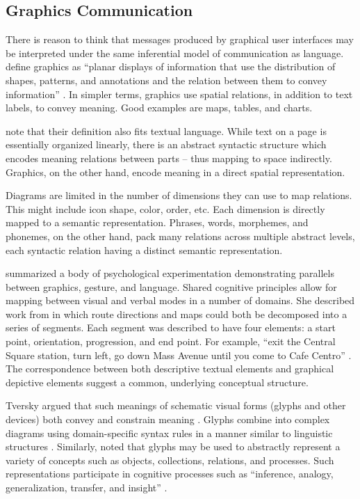 \subsection{Graphics Communication}
\label{graphicscommunication}

There is reason to think that messages produced by graphical user interfaces may be interpreted under the same inferential model of communication as language.  \cite{Stenning:2006wu}  define graphics as ``planar displays of information that use the distribution of shapes, patterns, and annotations and the relation between them to convey information''  \cite[p. 476]{Stenning:2006wu}.  In simpler terms, graphics use spatial relations, in addition to text labels, to convey meaning. Good examples are maps, tables, and charts. 

 \cite{Stenning:2006wu}  note that their definition also fits textual language. While text on a page is essentially organized linearly, there is an abstract syntactic structure which encodes meaning relations between parts -- thus mapping to space indirectly. Graphics, on the other hand, encode meaning in a direct spatial representation. 

Diagrams are limited in the number of dimensions they can use to map relations. This might include icon shape, color, order, etc. Each dimension is directly mapped to a semantic representation. Phrases, words, morphemes, and phonemes, on the other hand, pack many relations across multiple abstract levels, each syntactic relation having a distinct semantic representation.

 \cite{Tversky:2004wj,Tversky:2010ww}  summarized a body of psychological experimentation demonstrating parallels between graphics, gesture, and language. Shared cognitive principles allow for mapping between visual and verbal modes in a number of domains. She described work from  \cite{Denis:1997}  in which route directions and maps could both be decomposed into a series of segments. Each segment was described to have four elements: a start point, orientation, progression, and end point. For example, ``exit the Central Square station, turn left, go down Mass Avenue until you come to Cafe Centro''  \cite[p. 146]{Tversky:2004wj}.  The correspondence between both descriptive textual elements and graphical depictive elements suggest a common, underlying conceptual structure.

Tversky argued that such meanings of schematic visual forms (glyphs and other devices) both convey and constrain meaning  \cite{Tversky:2010ww}.  Glyphs combine into complex diagrams using domain-specific syntax rules in a manner similar to linguistic structures  \citep{Tversky:1999ta}.  Similarly,  \cite{Tversky:2010ww}  noted that glyphs may be used to abstractly represent a variety of concepts such as objects, collections, relations, and processes. Such representations participate in cognitive processes such as ``inference, analogy, generalization, transfer, and insight''  \citep[p. 2]{Tversky:2010ww}. 

